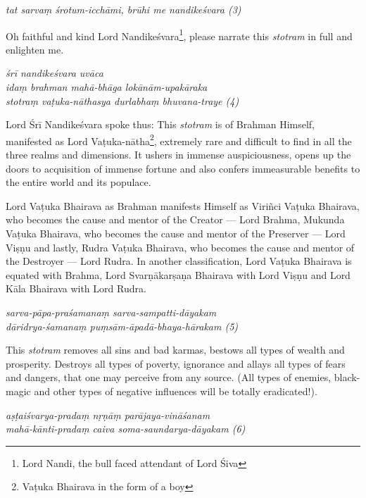 \documentclass[11pt,oneside,a4paper]{article}
\newenvironment{shloka}[1]
  {\bigskip\center#1\varwidth{\linewidth}}
  {\endvarwidth\endcenter\bigskip}
\newcommand{\tl}[1]{\emph{#1}}
\begin{document}
\begin{shloka}\itshape
  tat sarvaṃ śrotum-icchāmi, brūhi me nandikeśvara (3)
\end{shloka}

Oh faithful and kind Lord Nandikeśvara\footnote{Lord Nandi, the bull faced
attendant of Lord Śiva}, please narrate this \tl{stotram} in full and
enlighten me.

\begin{shloka}\itshape
  śrī nandikeśvara uvāca\\
  idaṃ brahman mahā-bhāga lokānām-upakāraka\\
  stotraṃ vaṭuka-nāthasya durlabhaṃ bhuvana-traye (4)
\end{shloka}

Lord Śrī Nandikeśvara spoke thus: This \tl{stotram} is of Brahman Himself,
manifested as Lord Vaṭuka-nātha\footnote{Vaṭuka Bhairava in the form of a boy},
extremely rare and difficult to find in all the three realms and dimensions.
It ushers in immense auspiciousness, opens up the doors to acquisition of
immense fortune and also confers immeasurable benefits to the entire world and
its populace.

Lord Vaṭuka Bhairava as Brahman manifests Himself as Viriñci Vaṭuka Bhairava,
who becomes the cause and mentor of the Creator — Lord Brahma, Mukunda Vaṭuka
Bhairava, who becomes the cause and mentor of the Preserver — Lord Viṣṇu and
lastly, Rudra Vaṭuka Bhairava, who becomes the cause and mentor of the Destroyer
— Lord Rudra. In another classification, Lord Vaṭuka Bhairava is equated with
Brahma, Lord Svarṇākarṣaṇa Bhairava with Lord Viṣṇu and Lord Kāla Bhairava with
Lord Rudra.

\begin{shloka}\itshape
  sarva-pāpa-praśamanaṃ sarva-sampatti-dāyakam\\
  dāridrya-śamanaṃ puṃsām-āpadā-bhaya-hārakam (5)
\end{shloka}

This \tl{stotram} removes all sins and bad karmas, bestows all types of wealth
and prosperity. Destroys all types of poverty, ignorance and allays all types
of fears and dangers, that one may perceive from any source. (All types of
enemies, black-magic and other types of negative influences will be totally
eradicated!).

\begin{shloka}\itshape
  aṣṭaiśvarya-pradaṃ nṛṇāṃ parājaya-vināśanam\\
  mahā-kānti-pradaṃ caiva soma-saundarya-dāyakam (6)
\end{shloka}
\end{document}
